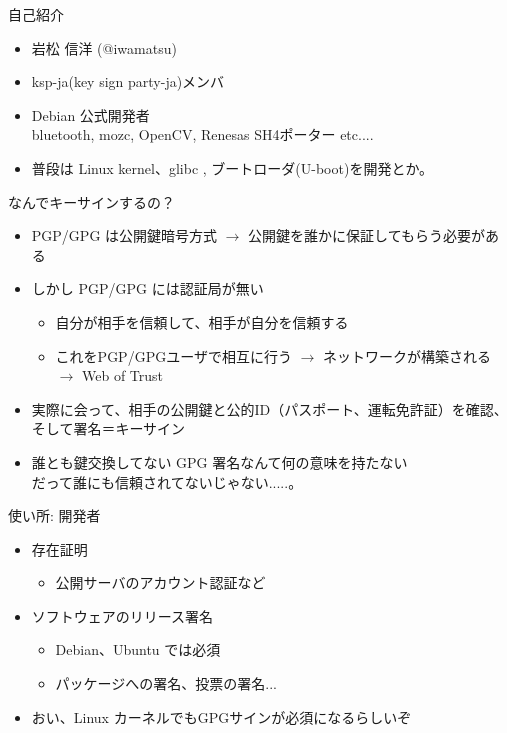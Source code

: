 \frame{\titlepage{}}

\begin{frame}{自己紹介}
\begin{itemize}[<+->]

\item 岩松 信洋 (@iwamatsu)
\item ksp-ja(key sign party-ja)メンバ
\item Debian 公式開発者 \\
bluetooth, mozc, OpenCV, Renesas SH4ポーター etc....
\item 普段は Linux kernel、glibc , ブートローダ(U-boot)を開発とか。
\end{itemize}
\end{frame}

\begin{frame}
\begin{center}
\LARGE{なんでキーサインするの？}
\end{center}
\end{frame}

\begin{frame}
  \begin{itemize}[<+->]
    \item PGP/GPG は公開鍵暗号方式 $\rightarrow$ 公開鍵を誰かに保証してもらう必要がある
    \item しかし PGP/GPG には認証局が無い
    \begin{itemize}
      \item 自分が相手を信頼して、相手が自分を信頼する
      \item これをPGP/GPGユーザで相互に行う $\rightarrow$ ネットワークが構築される $\rightarrow$ Web of Trust
    \end{itemize}
    \item 実際に会って、相手の公開鍵と公的ID（パスポート、運転免許証）を確認、そして署名＝キーサイン
    \item 誰とも鍵交換してない GPG 署名なんて何の意味を持たない\\
          だって誰にも信頼されてないじゃない.....。
  \end{itemize}
\end{frame}

\begin{frame}{使い所: 開発者}
\begin{itemize}
  \item 存在証明
  \begin{itemize}
    \item 公開サーバのアカウント認証など
  \end{itemize}
  \item ソフトウェアのリリース署名
  \begin{itemize}
    \item Debian、Ubuntu では必須
    \item パッケージへの署名、投票の署名...
  \end{itemize}
  \item おい、Linux カーネルでもGPGサインが必須になるらしいぞ
\end{itemize}
\end{frame}


